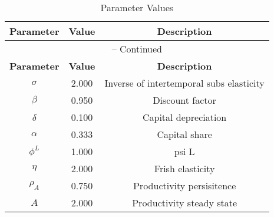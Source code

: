\begin{center}
\begin{longtable}{ccc}
\caption{Parameter Values}\\%
\toprule%
\multicolumn{1}{c}{\textbf{Parameter}} &
\multicolumn{1}{c}{\textbf{Value}} &
 \multicolumn{1}{c}{\textbf{Description}}\\%
\midrule%
\endfirsthead
\multicolumn{3}{c}{{\tablename} \thetable{} -- Continued}\\%
\midrule%
\multicolumn{1}{c}{\textbf{Parameter}} &
\multicolumn{1}{c}{\textbf{Value}} &
  \multicolumn{1}{c}{\textbf{Description}}\\%
\midrule%
\endhead
$\sigma$ 	 & 	 2.000 	 & 	 Inverse of intertemporal subs elasticity\\
$\beta$ 	 & 	 0.950 	 & 	 Discount factor\\
$\delta$ 	 & 	 0.100 	 & 	 Capital depreciation\\
$\alpha$ 	 & 	 0.333 	 & 	 Capital share\\
$\phi^{L}$ 	 & 	 1.000 	 & 	 psi L\\
$\eta$ 	 & 	 2.000 	 & 	 Frish elasticity\\
$\rho_{A}$ 	 & 	 0.750 	 & 	 Productivity persisitence\\
$A$ 	 & 	 2.000 	 & 	 Productivity steady state\\
\bottomrule%
\end{longtable}
\end{center}
